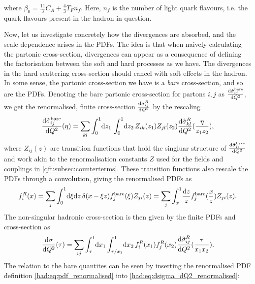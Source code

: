 \documentclass[../main.tex]{subfiles}
\begin{document}
where \(\beta_0 = \frac{11}{3}C_A + \frac{4}{3} T_F n_f\).
Here, \(n_f\) is the number of light quark flavours, i.e. the quark flavours present in the hadron in question.
\medskip

Now, let us investigate concretely how the divergences are absorbed, and the scale dependence arises in the PDFs.
The idea is that when naively calculating the partonic cross-section, divergences can appear as a consequence of defining the factorisation between the soft and hard processes as we have.
The divergences in the hard scattering cross-section should cancel with soft effects in the hadron.
In some sense, the partonic cross-section we have is a \emph{bare} cross-section, and so are the PDFs.
Denoting the bare partonic cross-section for partons \(i, j\) as \(\d[Q^2]{\hat\sigma^\text{bare}_{ij}}\), we get the renormalised, finite cross-section \(\d[Q^2]{\hat\sigma^R_{ij}}\) by the rescaling
\begin{equation}
  \label{had:eq:renormalised_xsec}
  \d[Q^2]{\hat\sigma^\text{bare}_{ij}}(\eta) =\sum_{kl} \integral[_0^1]{z_1} \integral[_0^1]{z_2} Z_{ik}(z_1) Z_{jl}(z_2) \d[Q^2]{\hat\sigma^R_{kl}}(\frac{\eta}{z_1 z_2}),
\end{equation}
where \(Z_{ij}(z)\) are transition functions that hold the singluar structure of \(\d[Q^2]{\hat\sigma^\text{bare}_{ij}}\) and work akin to the renormalisation constants \(Z\) used for the fields and couplings in \cref{qft:subsec:counterterms}.
These transition functions also rescale the PDFs through a convolution, giving the renormalised PDFs as
\begin{equation}
  \label{had:eq:pdf_renormalised}
  f_i^R(x) = \sum_{j} \integral[_0^1]{\xi \mathrm{d}z} \delta(x - \xi z) f_j^\text{bare}(\xi) Z_{ji}(z) = \sum_{j}\int_x^1 \! \frac{\mathrm{d}z}{z} f_j^\text{bare}(\frac{x}{z}) Z_{ji}(z).
\end{equation}
The non-singular hadronic cross-section is then given by the finite PDFs and cross-section as
\begin{equation}
  \label{had:eq:dsigma_dQ2_renormalised}
  \d[Q^2]{\sigma}(\tau) = \sum_ {ij} \integral[_\tau^1]{x_1}\!\integral[_{\tau/x_1}^1]{x_2} f_i^R(x_1) f_j^R(x_2) \d[Q^2]{\hat\sigma^R_{ij}}(\frac{\tau}{x_1 x_2}).
\end{equation}
The relation to the bare quantites can be seen by inserting the renormalised PDF definition \cref{had:eq:pdf_renormalised} into \cref{had:eq:dsigma_dQ2_renormalised}:
\end{document}
